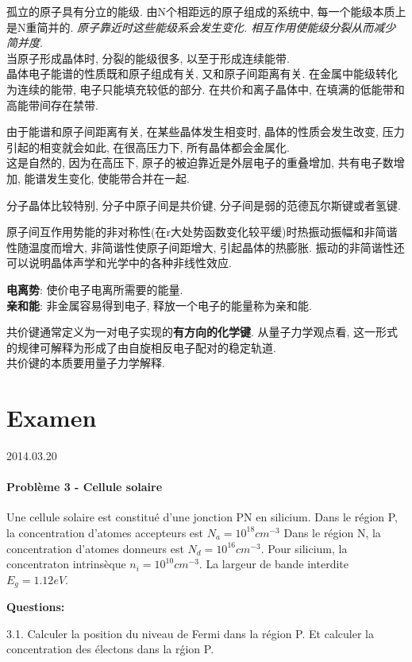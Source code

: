 \documentclass[openany]{article}
\begin{document}
孤立的原子具有分立的能级. 由N个相距远的原子组成的系统中, 每一个能级本质上是N重简并的. \emph{原子靠近时这些能级系会发生变化.  相互作用使能级分裂从而减少简并度}.\\
当原子形成晶体时, 分裂的能级很多, 以至于形成连续能带.\\
晶体电子能谱的性质既和原子组成有关, 又和原子间距离有关. 在金属中能级转化为连续的能带, 电子只能填充较低的部分. 在共价和离子晶体中, 在填满的低能带和高能带间存在禁带.

由于能谱和原子间距离有关, 在某些晶体发生相变时, 晶体的性质会发生改变, 压力引起的相变就会如此, 在很高压力下, 所有晶体都会金属化.\\
这是自然的, 因为在高压下, 原子的被迫靠近是外层电子的重叠增加, 共有电子数增加, 能谱发生变化, 使能带合并在一起.

分子晶体比较特别, 分子中原子间是共价键,
分子间是弱的范德瓦尔斯键或者氢键.

原子间互作用势能的非对称性(在r大处势函数变化较平缓)时热振动振幅和非简谐性随温度而增大,
非简谐性使原子间距增大, 引起晶体的热膨胀.
振动的非简谐性还可以说明晶体声学和光学中的各种非线性效应.

\textbf{电离势}: 使价电子电离所需要的能量.\\
\textbf{亲和能}: 非金属容易得到电子, 释放一个电子的能量称为亲和能.

共价键通常定义为一对电子实现的\textbf{有方向的化学键}. 从量子力学观点看, 这一形式的规律可解释为形成了由自旋相反电子配对的稳定轨道.\\
共价键的本质要用量子力学解释.

\section{Examen}
2014.03.20

\paragraph{Probl\`eme 3 - Cellule solaire}
Une cellule solaire est constitu\'e d'une jonction PN en silicium. 
Dans le r\'egion P, la concentration d'atomes accepteurs est $N_a = 10^{18} {cm}^{-3}$
Dans le r\'egion N, la concentration d'atomes donneurs est $N_d = 10^{16} {cm}^{-3}$.
Pour silicium, la concentraton intrins\`eque $n_i = 10^{10} cm^{-3}$.
La largeur de bande interdite $E_g  = 1.12 eV$.

\textbf{Questions:}

3.1. Calculer la position du niveau de Fermi dans la r\'egion P. Et calculer la concentration des \'electons dans la r\'gion P.
\end{document}
